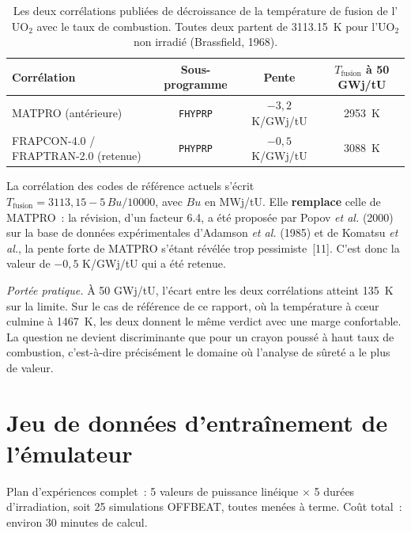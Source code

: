 \documentclass[12pt,a4paper,french]{report}
\begin{document}
\begin{table}[htbp]
\centering
\caption[Corrélations de fusion de l'UO2]{Les deux corrélations publiées de décroissance de la température de
fusion de l'$\mathrm{UO_2}$ avec le taux de combustion. Toutes deux partent de
\SI{3113.15}{\kelvin} pour l'$\mathrm{UO_2}$ non irradié (Brassfield, 1968).}
\label{tab:fusion}
\small
\begin{tabularx}{\textwidth}{@{}Xccc@{}}
\toprule
\textbf{Corrélation} & \textbf{Sous-programme} & \textbf{Pente} &
\textbf{$T_{\text{fusion}}$ à 50 GWj/tU}\\
\midrule
MATPRO (antérieure) & \texttt{FHYPRP} & $-3{,}2$ K/GWj/tU
  & \SI{2953}{\kelvin}\\
FRAPCON-4.0 / FRAPTRAN-2.0 (retenue) & \texttt{PHYPRP} &
  $-0{,}5$ K/GWj/tU & \SI{3088}{\kelvin}\\
\bottomrule
\end{tabularx}
\end{table}

La corrélation des codes de référence actuels s'écrit
$T_{\text{fusion}} = 3113{,}15 - 5\,Bu/10000$, avec $Bu$ en MWj/tU. Elle
\textbf{remplace} celle de MATPRO~: la révision, d'un facteur \num{6.4}, a été
proposée par Popov \textit{et al.} (2000) sur la base de données expérimentales
d'Adamson \textit{et al.} (1985) et de Komatsu \textit{et al.}, la pente forte
de MATPRO s'étant révélée trop pessimiste~[11]. C'est donc la valeur de
$-0{,}5$ K/GWj/tU qui a été retenue.

\vspace{0.3cm}
\noindent
\textit{Portée pratique.} À 50 GWj/tU, l'écart entre les deux corrélations
atteint \SI{135}{\kelvin} sur la limite. Sur le cas de référence de ce rapport,
où la température à c\oe ur culmine à \SI{1467}{\kelvin}, les deux donnent le
même verdict avec une marge confortable. La question ne devient discriminante
que pour un crayon poussé à haut taux de combustion, c'est-à-dire précisément
le domaine où l'analyse de sûreté a le plus de valeur.

\section{Jeu de données d'entraînement de l'émulateur}
\label{ann:dataset}

\noindent Plan d'expériences complet~: \num{5} valeurs de puissance linéique
$\times$ \num{5} durées d'irradiation, soit \num{25} simulations OFFBEAT,
toutes menées à terme. Coût total~: environ \num{30} minutes de calcul.
\end{document}
